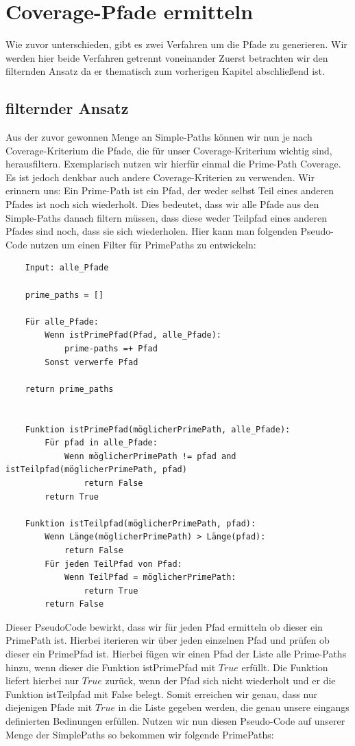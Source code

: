 \section{Coverage-Pfade ermitteln}

Wie zuvor unterschieden, gibt es zwei Verfahren um die Pfade zu generieren.
Wir werden hier beide Verfahren getrennt voneinander
Zuerst betrachten wir den filternden Ansatz da er thematisch zum vorherigen Kapitel abschließend ist.

\subsection{filternder Ansatz}
Aus der zuvor gewonnen Menge an Simple-Paths können wir nun je nach Coverage-Kriterium die Pfade, die für unser Coverage-Kriterium
wichtig sind, herausfiltern.
Exemplarisch nutzen wir hierfür einmal die Prime-Path Coverage.
Es ist jedoch denkbar auch andere Coverage-Kriterien zu verwenden.
Wir erinnern uns: Ein Prime-Path ist ein Pfad, der weder selbst Teil eines anderen Pfades ist noch sich wiederholt.
Dies bedeutet, dass wir alle Pfade aus den Simple-Paths danach filtern müssen, dass diese weder Teilpfad eines anderen Pfades sind
noch, dass sie sich wiederholen.
Hier kann man folgenden Pseudo-Code nutzen um einen Filter für PrimePaths zu entwickeln:

\begin{verbatim}
    Input: alle_Pfade

    prime_paths = []

    Für alle_Pfade:
        Wenn istPrimePfad(Pfad, alle_Pfade):
            prime-paths =+ Pfad
        Sonst verwerfe Pfad

    return prime_paths


    Funktion istPrimePfad(möglicherPrimePath, alle_Pfade):
        Für pfad in alle_Pfade:
            Wenn möglicherPrimePath != pfad and istTeilpfad(möglicherPrimePath, pfad)
                return False
        return True

    Funktion istTeilpfad(möglicherPrimePath, pfad):
        Wenn Länge(möglicherPrimePath) > Länge(pfad):
            return False
        Für jeden TeilPfad von Pfad:
            Wenn TeilPfad = möglicherPrimePath:
                return True
        return False

\end{verbatim}

Dieser PseudoCode bewirkt, dass wir für jeden Pfad ermitteln ob dieser ein PrimePath ist.
Hierbei iterieren wir über jeden einzelnen Pfad und prüfen ob dieser ein PrimePfad ist.
Hierbei fügen wir einen Pfad der Liste alle Prime-Paths hinzu, wenn dieser die Funktion istPrimePfad mit $True$ erfüllt.
Die Funktion liefert hierbei nur $True$ zurück, wenn der Pfad sich nicht wiederholt und er die Funktion istTeilpfad mit False belegt.
Somit erreichen wir genau, dass nur diejenigen Pfade mit $True$ in die Liste gegeben werden, die genau unsere eingangs definierten Bedinungen
erfüllen.
Nutzen wir nun diesen Pseudo-Code auf unserer Menge der SimplePaths so bekommen wir folgende PrimePaths:

